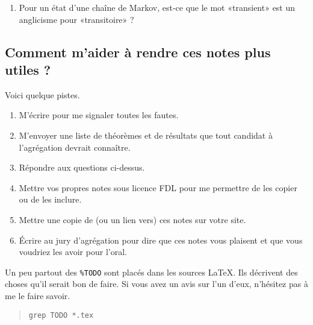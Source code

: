 \begin{enumerate}
    \item
        Pour un état d'une chaîne de Markov, est-ce que le mot «transient» est un anglicisme pour «transitoire» ?
\end{enumerate}


\subsection{Comment m'aider à rendre ces notes plus utiles ?}

Voici quelque pistes.

\begin{enumerate}
    \item
        M'écrire pour me signaler toutes les fautes.
    \item
        M'envoyer une liste de théorèmes et de résultats que tout candidat à l'agrégation devrait connaître.
    \item
        Répondre aux questions ci-dessus.
    \item
        Mettre vos propres notes sous licence FDL pour me permettre de les copier ou de les inclure. 
    \item
        Mettre une copie de (ou un lien vers) ces notes sur votre site.
    \item
        Écrire au jury d'agrégation pour dire que ces notes vous plaisent et que vous voudriez les avoir pour l'oral.
\end{enumerate}

Un peu partout des \verb+%TODO+ sont placés dans les sources \LaTeX. Ils décrivent des choses qu'il serait bon de faire. Si vous avez un avis sur l'un d'eux, n'hésitez pas à me le faire savoir.
\begin{quote}
    \texttt{grep TODO *.tex}
\end{quote}
